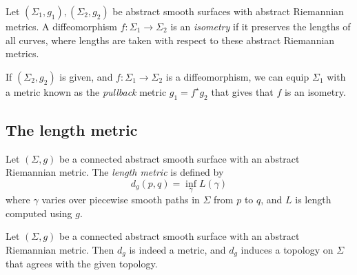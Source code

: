 \begin{definition}
	Let \( (\Sigma_1, g_1), (\Sigma_2, g_2) \) be abstract smooth surfaces with abstract Riemannian metrics.
	A diffeomorphism \( f \colon \Sigma_1 \to \Sigma_2 \) is an \textit{isometry} if it preserves the lengths of all curves, where lengths are taken with respect to these abstract Riemannian metrics.
\end{definition}
\begin{example}
	If \( (\Sigma_2, g_2) \) is given, and \( f \colon \Sigma_1 \to \Sigma_2 \) is a diffeomorphism, we can equip \( \Sigma_1 \) with a metric known as the \textit{pullback} metric \( g_1 = f^\star g_2 \) that gives that \( f \) is an isometry.
\end{example}

\subsection{The length metric}
\begin{definition}
	Let \( (\Sigma, g) \) be a connected abstract smooth surface with an abstract Riemannian metric.
	The \textit{length metric} is defined by
	\[
		d_g(p,q) = \inf_\gamma L(\gamma)
	\]
	where \( \gamma \) varies over piecewise smooth paths in \( \Sigma \) from \( p \) to \( q \), and \( L \) is length computed using \( g \).
\end{definition}
\begin{proposition}
	Let \( (\Sigma, g) \) be a connected abstract smooth surface with an abstract Riemannian metric.
	Then \( d_g \) is indeed a metric, and \( d_g \) induces a topology on \( \Sigma \) that agrees with the given topology.
\end{proposition}
